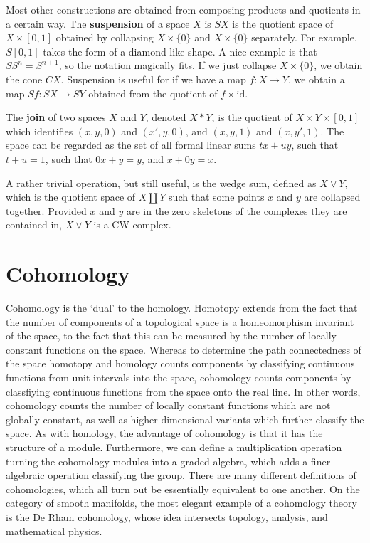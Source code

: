 Most other constructions are obtained from composing products and quotients in a certain way. The {\bf suspension} of a space $X$ is $SX$ is the quotient space of $X \times [0,1]$ obtained by collapsing $X \times \{ 0 \}$ and $X \times \{ 0 \}$ separately. For example, $S[0,1]$ takes the form of a diamond like shape. A nice example is that $SS^n = S^{n+1}$, so the notation magically fits. If we just collapse $X \times \{ 0 \}$, we obtain the cone $CX$. Suspension is useful for if we have a map $f:X \to Y$, we obtain a map $Sf: SX \to SY$ obtained from the quotient of $f \times \text{id}$.

The {\bf join} of two spaces $X$ and $Y$, denoted $X*Y$, is the quotient of $X \times Y \times [0,1]$ which identifies $(x,y,0)$ and $(x',y,0)$, and $(x,y,1)$ and $(x,y',1)$. The space can be regarded as the set of all formal linear sums $tx + uy$, such that $t + u = 1$, such that $0x + y = y$, and $x + 0y = x$.

A rather trivial operation, but still useful, is the wedge sum, defined as $X \vee Y$, which is the quotient space of $X \coprod Y$ such that some points $x$ and $y$ are collapsed together. Provided $x$ and $y$ are in the zero skeletons of the complexes they are contained in, $X \vee Y$ is a CW complex.









\chapter{Cohomology}

Cohomology is the `dual' to the homology. Homotopy extends from the fact that the number of components of a topological space is a homeomorphism invariant of the space, to the fact that this can be measured by the number of locally constant functions on the space. Whereas to determine the path connectedness of the space homotopy and homology counts components by classifying continuous functions from unit intervals into the space, cohomology counts components by classfiying continuous functions from the space onto the real line. In other words, cohomology counts the number of locally constant functions which are not globally constant, as well as higher dimensional variants which further classify the space. As with homology, the advantage of cohomology is that it has the structure of a module. Furthermore, we can define a multiplication operation turning the cohomology modules into a graded algebra, which adds a finer algebraic operation classifying the group. There are many different definitions of cohomologies, which all turn out be essentially equivalent to one another. On the category of smooth manifolds, the most elegant example of a cohomology theory is the De Rham cohomology, whose idea intersects topology, analysis, and mathematical physics.

